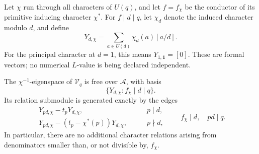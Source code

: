 Let \(\chi\) run through all characters of \(U(q)\), and let \(f=f_\chi\)
be the conductor of its primitive inducing character \(\chi^*\).
For \(f\mid d\mid q\), let \(\chi_d\) denote the induced character
modulo \(d\), and define
\begin{equation}
 Y_{d,\chi}=\sum_{a\in U(d)}\chi_d(a)[a/d].
 \label{dist:eq:dist-character-vector}
\end{equation}
For the principal character at \(d=1\), this means
\(Y_{1,\mathbf1}=[0]\). These are formal vectors; no numerical
\(L\)-value is being declared independent.

\begin{lemma}
\label{dist:lem:dist-all-components}
The \(\chi^{-1}\)-eigenspace of \(\mathcal V_q\) is free over
\(\mathcal A\), with basis
\[
 \{Y_{d,\chi}: f_\chi\mid d\mid q\}.
\]
Its relation submodule is generated exactly by the edges
\begin{equation}
 \begin{aligned}
 Y_{pd,\chi}-t_pY_{d,\chi},
     &\qquad p\mid d,\\
 Y_{pd,\chi}-(t_p-\chi^*(p))Y_{d,\chi},
     &\qquad p\nmid d,
 \end{aligned}
 \qquad f_\chi\mid d,\quad pd\mid q.
 \label{dist:eq:dist-character-edges}
\end{equation}
In particular, there are no additional character relations arising
from denominators smaller than, or not divisible by, \(f_\chi\).
\end{lemma}

